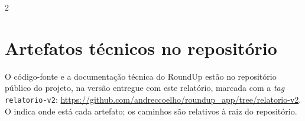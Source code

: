 \begin{apendicesenv}
{\small\SingleSpacing
\setlength{\columnsep}{0.8cm}
\begin{multicols}{2}

\end{multicols}
}

\chapter{Artefatos técnicos no repositório}
\label{ap:artefatos}

O código-fonte e a documentação técnica do RoundUp estão no repositório
público do projeto, na versão entregue com este relatório, marcada com a
\textit{tag} \texttt{relatorio-v2}:
\url{https://github.com/andreccoelho/roundup_app/tree/relatorio-v2}.
O  indica onde está cada artefato; os caminhos são
relativos à raiz do repositório.


\end{apendicesenv}
